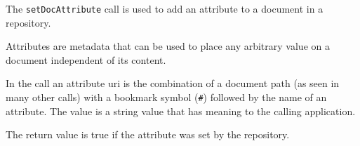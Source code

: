 The \verb+setDocAttribute+ call is used to add an attribute to a document in a repository.

Attributes are metadata that can be used to place any arbitrary value on a document independent of its
content.

In the call an attribute uri is the combination of a document path (as seen in many other calls) with a
bookmark symbol (\verb+#+) followed by the name of an attribute. The value is a string value that has
meaning to the calling application.

The return value is true if the attribute was set by the repository.
